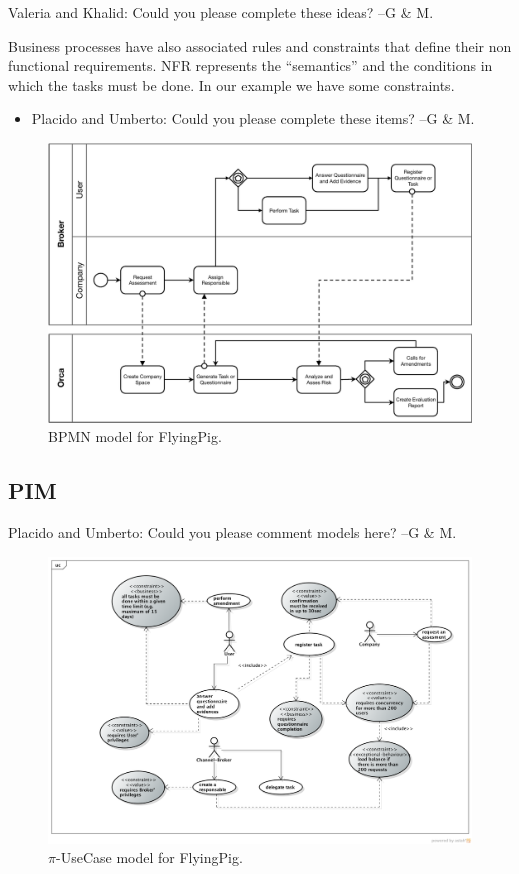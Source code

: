 {\color{magenta} Valeria and Khalid: Could you please complete these ideas? --G \& M.}


Business processes have also associated rules and constraints that define their non functional requirements.  
NFR represents the ``semantics'' and the conditions in which the tasks must be done. 
In our example we have some constraints. 
\begin{itemize}
\item {\color{magenta} Placido and Umberto: Could you please complete these items? --G \& M.}
\end{itemize}

\begin{figure}[t]
\centering
\includegraphics[width=1.0\textwidth]{figs/BPMN_GCP.pdf}
\caption{BPMN model for FlyingPig.\label{fig:BPMNmodel}}
\label{fig:bpmn}
\end{figure}


\subsection{PIM}


{\color{magenta} Placido and Umberto: Could you please comment models here? --G \& M.}


\begin{figure}
\centering
\includegraphics[width=1.0\textwidth]{figs/UseCaseGeneral.png}
\caption{$\pi$-UseCase model for FlyingPig.\label{fig:piUseCaseModel}}
\label{fig:bpmn}
\end{figure}

